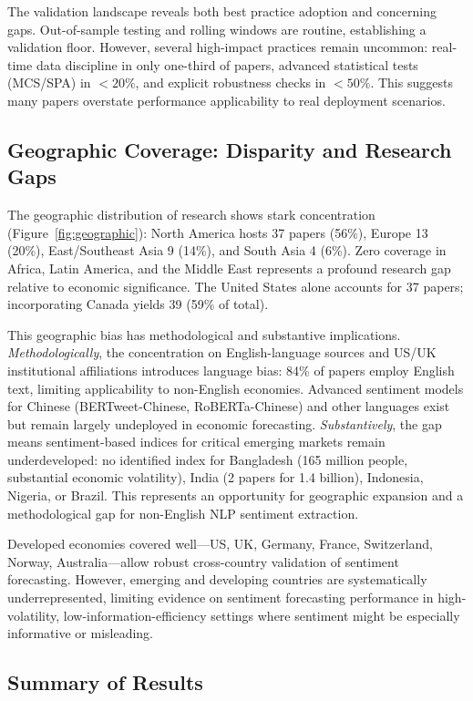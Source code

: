 The validation landscape reveals both best practice adoption and concerning gaps. Out-of-sample testing and rolling windows are routine, establishing a validation floor. However, several high-impact practices remain uncommon: real-time data discipline in only one-third of papers, advanced statistical tests (MCS/SPA) in $<20\%$, and explicit robustness checks in $<50\%$. This suggests many papers overstate performance applicability to real deployment scenarios.

\subsection{Geographic Coverage: Disparity and Research Gaps}

The geographic distribution of research shows stark concentration (Figure~\ref{fig:geographic}): North America hosts 37 papers (56\%), Europe 13 (20\%), East/Southeast Asia 9 (14\%), and South Asia 4 (6\%). Zero coverage in Africa, Latin America, and the Middle East represents a profound research gap relative to economic significance. The United States alone accounts for 37 papers; incorporating Canada yields 39 (59\% of total).

This geographic bias has methodological and substantive implications. \emph{Methodologically}, the concentration on English-language sources and US/UK institutional affiliations introduces language bias: 84\% of papers employ English text, limiting applicability to non-English economies. Advanced sentiment models for Chinese (BERTweet-Chinese, RoBERTa-Chinese) and other languages exist but remain largely undeployed in economic forecasting. \emph{Substantively}, the gap means sentiment-based indices for critical emerging markets remain underdeveloped: no identified index for Bangladesh (165 million people, substantial economic volatility), India (2 papers for 1.4 billion), Indonesia, Nigeria, or Brazil. This represents an opportunity for geographic expansion and a methodological gap for non-English NLP sentiment extraction.

Developed economies covered well---US, UK, Germany, France, Switzerland, Norway, Australia---allow robust cross-country validation of sentiment forecasting. However, emerging and developing countries are systematically underrepresented, limiting evidence on sentiment forecasting performance in high-volatility, low-information-efficiency settings where sentiment might be especially informative or misleading.

\subsection{Summary of Results}

